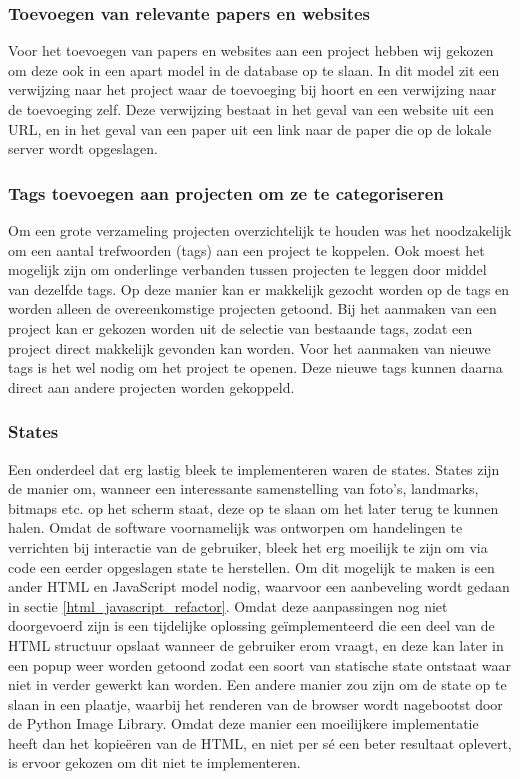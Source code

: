\subsubsection{Toevoegen van relevante papers en websites}
Voor het toevoegen van papers en websites aan een project hebben wij gekozen om deze ook in een apart model in de database op te slaan.
In dit model zit een verwijzing naar het project waar de toevoeging bij hoort en een verwijzing naar de toevoeging zelf.
Deze verwijzing bestaat in het geval van een website uit een URL, en in het geval van een paper uit een link naar de paper die op de lokale server wordt opgeslagen.

\subsubsection{Tags toevoegen aan projecten om ze te categoriseren}
Om een grote verzameling projecten overzichtelijk te houden was het noodzakelijk om een aantal trefwoorden (tags) aan een project te koppelen.
Ook moest het mogelijk zijn om onderlinge verbanden tussen projecten te leggen door middel van dezelfde tags.
Op deze manier kan er makkelijk gezocht worden op de tags en worden alleen de overeenkomstige projecten getoond.
Bij het aanmaken van een project kan er gekozen worden uit de selectie van bestaande tags, zodat een project direct makkelijk gevonden kan worden.
Voor het aanmaken van nieuwe tags is het wel nodig om het project te openen.
Deze nieuwe tags kunnen daarna direct aan andere projecten worden gekoppeld.

\subsubsection{States}
Een onderdeel dat erg lastig bleek te implementeren waren de states.
States zijn de manier om, wanneer een interessante samenstelling van foto's, landmarks, bitmaps etc. op het scherm staat, deze op te slaan om het later terug te kunnen halen.
Omdat de software voornamelijk was ontworpen om handelingen te verrichten bij interactie van de gebruiker, bleek het erg moeilijk te zijn om via code een eerder opgeslagen state te herstellen.
Om dit mogelijk te maken is een ander HTML en JavaScript model nodig, waarvoor een aanbeveling wordt gedaan in sectie \ref{html_javascript_refactor}.
Omdat deze aanpassingen nog niet doorgevoerd zijn is een tijdelijke oplossing ge\"{i}mplementeerd die een deel van de HTML structuur opslaat wanneer de gebruiker erom vraagt, en deze kan later in een popup weer worden getoond zodat een soort van statische state ontstaat waar niet in verder gewerkt kan worden.
Een andere manier zou zijn om de state op te slaan in een plaatje, waarbij het renderen van de browser wordt nagebootst door de Python Image Library.
Omdat deze manier een moeilijkere implementatie heeft dan het kopie\"{e}ren van de HTML, en niet per s\'{e} een beter resultaat oplevert, is ervoor gekozen om dit niet te implementeren.

